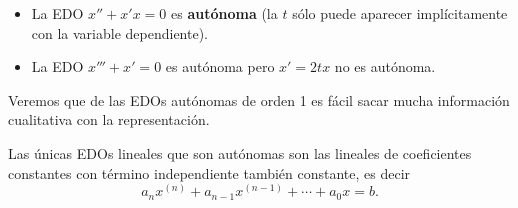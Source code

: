 \begin{itemize}
\begin{eg}
	\begin{itemize}
	\item La EDO $\displaystyle x'' + x' x = 0 $ es \textbf{autónoma} (la $\displaystyle t $ sólo puede aparecer implícitamente con la variable dependiente).
	\item La EDO $\displaystyle x''' + x' = 0 $ es autónoma pero $\displaystyle x' = 2tx $ no es autónoma.
	\end{itemize}
\end{eg}
\begin{observation}
Veremos que de las EDOs autónomas de orden 1 es fácil sacar mucha información cualitativa con la representación.
\end{observation}
\begin{observation}
 Las únicas EDOs lineales que son autónomas son las lineales de coeficientes constantes con término independiente también constante, es decir
\[a_{n}x^{\left(n\right)} + a_{n-1}x^{\left(n-1\right)} + \cdots + a_{0}x = b .\]
\end{observation}
\end{itemize}
